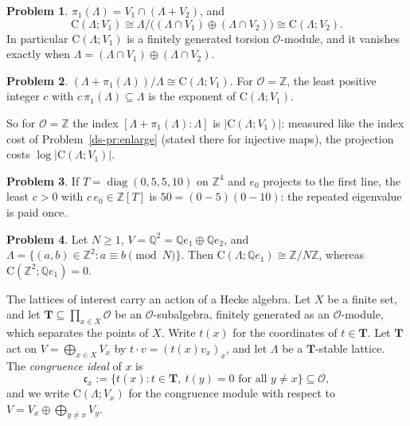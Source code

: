 \documentclass[reqno]{amsart}
\theoremstyle{definition}
\newtheorem{problem}{Problem}[section]
\theoremstyle{plain}
\newcommand{\Z}{\mathbb{Z}}
\newcommand{\Q}{\mathbb{Q}}
\newcommand{\Oc}{\mathcal{O}}
\newcommand{\T}{\mathbf{T}}
\newcommand{\cc}{\mathfrak{c}}
\newcommand{\Cg}{\mathrm{C}}
\begin{document}
\begin{problem}\label{pr:symmetry}
\(\pi_1(\Lambda) = V_1 \cap (\Lambda + V_2)\), and
\[
  \Cg(\Lambda; V_1) \cong \Lambda / \bigl((\Lambda \cap V_1) \oplus (\Lambda \cap V_2)\bigr) \cong \Cg(\Lambda; V_2) .
\]
In particular \(\Cg(\Lambda; V_1)\) is a finitely generated torsion \(\Oc\)-module, and it vanishes exactly when \(\Lambda = (\Lambda \cap V_1) \oplus (\Lambda \cap V_2)\).
\end{problem}

\begin{problem}\label{pr:denominator}
\((\Lambda + \pi_1(\Lambda))/\Lambda \cong \Cg(\Lambda; V_1)\).  For \(\Oc = \Z\), the least positive integer \(c\) with \(c\,\pi_1(\Lambda) \subseteq \Lambda\) is the exponent of \(\Cg(\Lambda; V_1)\).
\end{problem}

So for \(\Oc = \Z\) the index \([\Lambda + \pi_1(\Lambda) : \Lambda]\) is \(\lvert \Cg(\Lambda; V_1) \rvert\): measured like the index cost of Problem~\ref{ds-pr:enlarge} (stated there for injective maps), the projection costs \(\log \lvert \Cg(\Lambda; V_1) \rvert\).

\begin{problem}\label{pr:repeated}
If \(T = \operatorname{diag}(0, 5, 5, 10)\) on \(\Z^4\) and \(e_0\) projects to the first line, the least \(c > 0\) with \(c\,e_0 \in \Z[T]\) is \(50 = (0 - 5)(0 - 10)\): the repeated eigenvalue is paid once.
\end{problem}

\begin{problem}\label{pr:toy}
Let \(N \ge 1\), \(V = \Q^2 = \Q e_1 \oplus \Q e_2\), and \(\Lambda = \{(a,b) \in \Z^2 : a \equiv b \pmod N\}\).  Then \(\Cg(\Lambda; \Q e_1) \cong \Z/N\Z\), whereas \(\Cg(\Z^2; \Q e_1) = 0\).
\end{problem}

The lattices of interest carry an action of a Hecke algebra.  Let \(X\) be a finite set, and let \(\T \subseteq \prod_{x \in X} \Oc\) be an \(\Oc\)-subalgebra, finitely generated as an \(\Oc\)-module, which separates the points of \(X\).  Write \(t(x)\) for the coordinates of \(t \in \T\).  Let \(\T\) act on \(V = \bigoplus_{x \in X} V_x\) by \(t \cdot v = (t(x) v_x)_x\), and let \(\Lambda\) be a \(\T\)-stable lattice.  The \emph{congruence ideal} of \(x\) is
\[
  \cc_x := \{ t(x) : t \in \T,\ t(y) = 0 \text{ for all } y \ne x \} \subseteq \Oc ,
\]
and we write \(\Cg(\Lambda; V_x)\) for the congruence module with respect to \(V = V_x \oplus \bigoplus_{y \ne x} V_y\).
\end{document}
